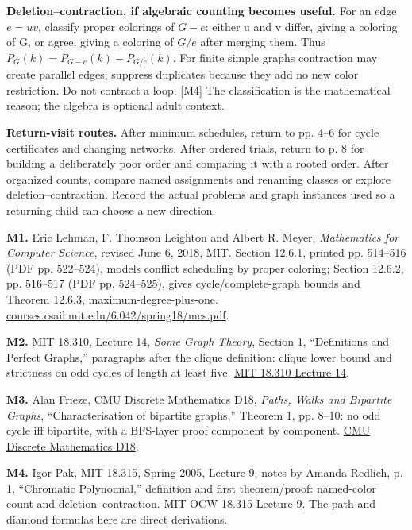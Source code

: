 \documentclass[10pt,letterpaper]{article}
\newcommand{\topic}[1]{\vspace{3pt}{\large\bfseries #1}\par}
\newcommand{\labelled}[2]{\textbf{#1} #2\par}
\begin{document}
\labelled{Deletion--contraction, if algebraic counting becomes useful.}{For an edge \(e=uv\), classify proper colorings of \(G-e\): either u and v differ, giving a coloring of G, or agree, giving a coloring of \(G/e\) after merging them. Thus \(P_G(k)=P_{G-e}(k)-P_{G/e}(k)\). For finite simple graphs contraction may create parallel edges; suppress duplicates because they add no new color restriction. Do not contract a loop. [M4] The classification is the mathematical reason; the algebra is optional adult context.}
\labelled{Return-visit routes.}{After minimum schedules, return to pp. 4--6 for cycle certificates and changing networks. After ordered trials, return to p. 8 for building a deliberately poor order and comparing it with a rooted order. After organized counts, compare named assignments and renaming classes or explore deletion--contraction. Record the actual problems and graph instances used so a returning child can choose a new direction.}
\newpage
\topic{Sources, adaptation and verification}
\labelled{M1.}{Eric Lehman, F. Thomson Leighton and Albert R. Meyer, \emph{Mathematics for Computer Science}, revised June 6, 2018, MIT. Section 12.6.1, printed pp. 514--516 (PDF pp. 522--524), models conflict scheduling by proper coloring; Section 12.6.2, pp. 516--517 (PDF pp. 524--525), gives cycle/complete-graph bounds and Theorem 12.6.3, maximum-degree-plus-one. \href{https://courses.csail.mit.edu/6.042/spring18/mcs.pdf}{courses.csail.mit.edu/6.042/spring18/mcs.pdf}.}
\labelled{M2.}{MIT 18.310, Lecture 14, \emph{Some Graph Theory}, Section 1, ``Definitions and Perfect Graphs,'' paragraphs after the clique definition: clique lower bound and strictness on odd cycles of length at least five. \href{https://math.mit.edu/~djk/18.310/Lecture-Notes/some_graph_theory_2007.html}{MIT 18.310 Lecture 14}.}
\labelled{M3.}{Alan Frieze, CMU Discrete Mathematics D18, \emph{Paths, Walks and Bipartite Graphs}, ``Characterisation of bipartite graphs,'' Theorem 1, pp. 8--10: no odd cycle iff bipartite, with a BFS-layer proof component by component. \href{https://www.math.cmu.edu/~af1p/Teaching/DM/D18.pdf}{CMU Discrete Mathematics D18}.}
\labelled{M4.}{Igor Pak, MIT 18.315, Spring 2005, Lecture 9, notes by Amanda Redlich, p. 1, ``Chromatic Polynomial,'' definition and first theorem/proof: named-color count and deletion--contraction. \href{https://ocw.mit.edu/courses/18-315-combinatorial-theory-introduction-to-graph-theory-extremal-and-enumerative-combinatorics-spring-2005/d1f49cd743278b91cb580542cc51bc3b_lec09.pdf}{MIT OCW 18.315 Lecture 9}. The path and diamond formulas here are direct derivations.}
\end{document}
